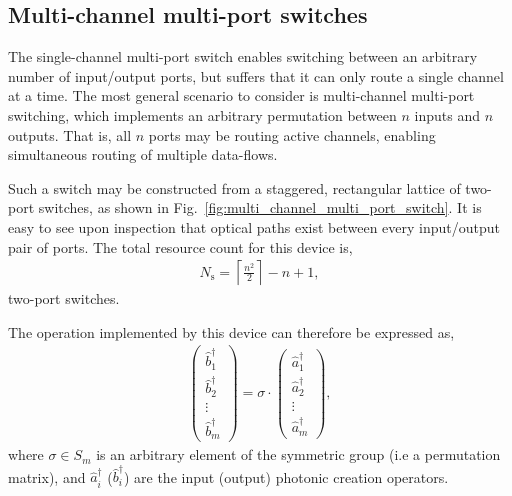 %
%

\subsection{Multi-channel multi-port switches} 

The single-channel multi-port switch enables switching between an arbitrary number of input/output ports, but suffers that it can only route a single channel at a time. The most general scenario to consider is multi-channel multi-port switching, which implements an arbitrary permutation between $n$ inputs and $n$ outputs. That is, all $n$ ports may be routing active channels, enabling simultaneous routing of multiple data-flows.

Such a switch may be constructed from a staggered, rectangular lattice of two-port switches, as shown in Fig.~\ref{fig:multi_channel_multi_port_switch}. It is easy to see upon inspection that optical paths exist between every input/output pair of ports. The total resource count for this device is,
\begin{align}
N_\mathrm{s} = \left\lceil \frac{n^2}{2}\right\rceil - n + 1,
\end{align}
two-port switches.

The operation implemented by this device can therefore be expressed as,
\begin{align}
	\left(\begin{matrix}{}
  		\hat{b}^\dag_1 \\
  		\hat{b}^\dag_2 \\
  		\vdots \\
  		\hat{b}^\dag_m
\end{matrix}\right)=\sigma\cdot\left(\begin{matrix}{}
  		\hat{a}^\dag_1 \\
  		\hat{a}^\dag_2 \\
  		\vdots \\
  		\hat{a}^\dag_m
\end{matrix}\right),
\end{align}
where \mbox{$\sigma\in S_m$} is an arbitrary element of the symmetric group (i.e a permutation matrix), and $\hat{a}_i^\dag$ ($\hat{b}_i^\dag$) are the input (output) photonic creation operators.

